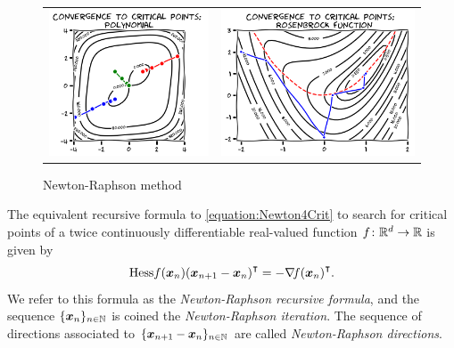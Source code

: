 \begin{figure}[ht!]
\begin{tabular}{cc}
\includegraphics[width=0.45\linewidth]{images/convergenceNewton.png} &
\includegraphics[width=0.55\linewidth]{images/convergenceNewtonRosenbrock.png} 
\end{tabular}
\caption{Newton-Raphson method}
\label{figure:NewtonConvergence}
\end{figure}

\begin{remark}
The equivalent recursive formula to \eqref{equation:Newton4Crit} to search for critical points of a twice continuously differentiable real-valued function $f \colon \mathbb{R}^d \to \mathbb{R}$ is given by
\begin{equation}\index{Newton-Raphson method}\index{Newton-Raphson method!recursive formula}\index{Newton-Raphson method!iteration}\index{Newton-Raphson method!direction}
\Hess{f}(\x_n) \transpose{(\x_{n+1}-\x_n)} = -\transpose{\gradient{f}(\x_n)}.
\end{equation}
We refer to this formula as the \emph{Newton-Raphson recursive formula}, and the sequence $\{ \boldsymbol{x}_n \}_{n \in \mathbb{N}}$ is coined the \emph{Newton-Raphson iteration}.  The sequence of directions associated to $\{ \boldsymbol{x}_{n+1} - \boldsymbol{x}_n \}_{n \in \mathbb{N}}$ are called \emph{Newton-Raphson directions}.
\end{remark}

